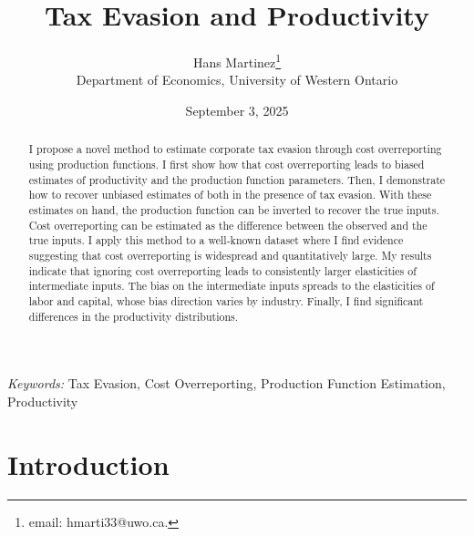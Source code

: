 \documentclass[
  12pt]{article}
\begin{document}
\def\spacingset#1{\renewcommand{\baselinestretch}%
{#1}\small\normalsize} \spacingset{1}



\date{September 3, 2025}
\title{\bf Tax Evasion and Productivity}
\author{
Hans Martinez\thanks{email: hmarti33@uwo.ca.}\\
Department of Economics, University of Western Ontario\\
}
\maketitle

\bigskip
\bigskip
\begin{abstract}
I propose a novel method to estimate corporate tax evasion through cost
overreporting using production functions. I first show how that cost
overreporting leads to biased estimates of productivity and the
production function parameters. Then, I demonstrate how to recover
unbiased estimates of both in the presence of tax evasion. With these
estimates on hand, the production function can be inverted to recover
the true inputs. Cost overreporting can be estimated as the difference
between the observed and the true inputs. I apply this method to a
well-known dataset where I find evidence suggesting that cost
overreporting is widespread and quantitatively large. My results
indicate that ignoring cost overreporting leads to consistently larger
elasticities of intermediate inputs. The bias on the intermediate inputs
spreads to the elasticities of labor and capital, whose bias direction
varies by industry. Finally, I find significant differences in the
productivity distributions.
\end{abstract}

\noindent%
{\it Keywords:} Tax Evasion, Cost Overreporting, Production Function
Estimation, Productivity
\vfill

\newpage
\spacingset{1.9} %

\section*{Introduction}\label{introduction}
\end{document}
